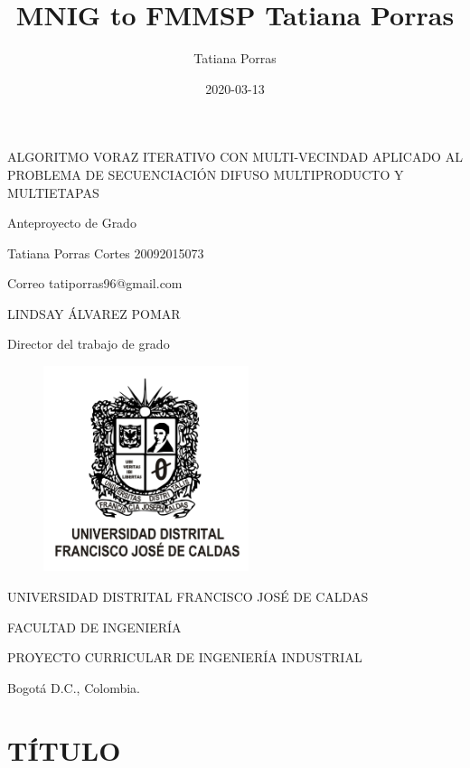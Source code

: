 \documentclass{article}
\title{MNIG to FMMSP Tatiana Porras}
\date{2020-03-13}
\author{Tatiana Porras}
\makeatletter
\let\dateVar\@date
\makeatother
\begin{document}
\begin{titlepage}
    \begin{center}
    ALGORITMO VORAZ ITERATIVO CON MULTI-VECINDAD APLICADO AL PROBLEMA DE SECUENCIACIÓN DIFUSO MULTIPRODUCTO Y MULTIETAPAS
    \par \bigskip
    Anteproyecto de Grado
    \par \vspace{5cm}
    Tatiana Porras Cortes \hspace{1cm} 20092015073
    \par \medskip
    Correo \hspace{1cm} tatiporras96@gmail.com
    \par \bigskip
    LINDSAY ÁLVAREZ POMAR \par Director del trabajo de grado
    \par \vspace{1cm}
    \begin{figure}[h!]
        \begin{center}
        \includegraphics[width=6cm]{EscudoUD1.png}
        \end{center}
    \end{figure}
    \par UNIVERSIDAD DISTRITAL FRANCISCO JOSÉ DE CALDAS
    \par FACULTAD DE INGENIERÍA
    \par PROYECTO CURRICULAR DE INGENIERÍA INDUSTRIAL
    \par Bogotá D.C., Colombia. \dateVar
    \end{center}
\end{titlepage}

\renewcommand{\contentsname}{Tabla de Contenido}

\tableofcontents

\setcounter{section}{-1}

\section{TÍTULO}
\end{document}
